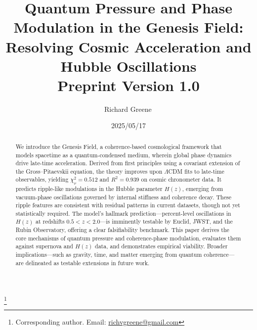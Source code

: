 \documentclass[aps,prd,preprint,12pt,superscriptaddress,nofootinbib]{revtex4-2}
\begin{document}
\title{\texorpdfstring{
\textbf{Quantum Pressure and Phase Modulation in the Genesis Field: Resolving Cosmic Acceleration and Hubble Oscillations} \\
\normalsize Preprint Version 1.0
}{The Genesis Field: Phase Modulation and the Hubble Tension}}

\author{Richard Greene\,}
\thanks{Corresponding author. Email: \href{mailto:richvgreene@gmail.com}{richvgreene@gmail.com}}
\date{2025/05/17}

\begin{abstract}
\noindent
\justifying
We introduce the Genesis Field, a coherence-based cosmological framework that models spacetime as a quantum-condensed medium, wherein global phase dynamics drive late-time acceleration. Derived from first principles using a covariant extension of the Gross–Pitaevskii equation, the theory improves upon $\Lambda$CDM fits to late-time observables, yielding $\chi^2_\nu = 0.512$ and $R^2 = 0.939$ on cosmic chronometer data. It predicts ripple-like modulations in the Hubble parameter \( H(z) \), emerging from vacuum-phase oscillations governed by internal stiffness and coherence decay. These ripple features are consistent with residual patterns in current datasets, though not yet statistically required. The model's hallmark prediction—percent-level oscillations in \( H(z) \) at redshifts \( 0.5 < z < 2.0 \)—is imminently testable by Euclid, JWST, and the Rubin Observatory, offering a clear falsifiability benchmark. This paper derives the core mechanisms of quantum pressure and coherence-phase modulation, evaluates them against supernova and $H(z)$ data, and demonstrates empirical viability. Broader implications—such as gravity, time, and matter emerging from quantum coherence—are delineated as testable extensions in future work.
\end{abstract}

\maketitle
\clearpage
\tableofcontents
\clearpage




\end{document}
